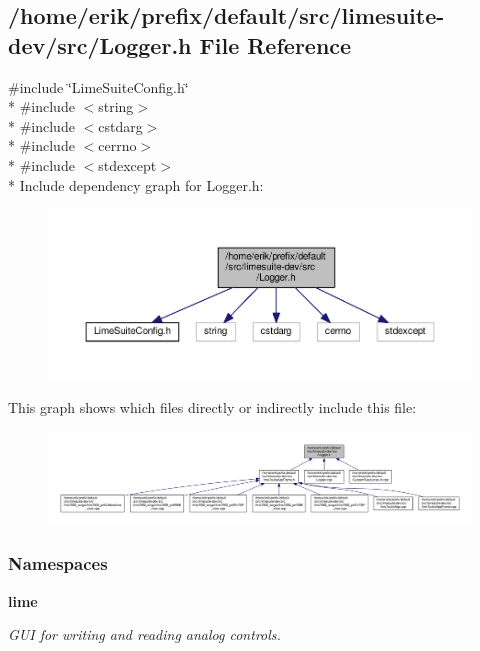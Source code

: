 \subsection{/home/erik/prefix/default/src/limesuite-\/dev/src/\+Logger.h File Reference}
\label{limesuite-dev_2src_2Logger_8h}
{\ttfamily \#include \char`\"{}Lime\+Suite\+Config.\+h\char`\"{}}\\*
{\ttfamily \#include $<$string$>$}\\*
{\ttfamily \#include $<$cstdarg$>$}\\*
{\ttfamily \#include $<$cerrno$>$}\\*
{\ttfamily \#include $<$stdexcept$>$}\\*
Include dependency graph for Logger.\+h\+:
\nopagebreak
\begin{figure}[H]
\begin{center}
\leavevmode
\includegraphics[width=350pt]{d6/d24/limesuite-dev_2src_2Logger_8h__incl}
\end{center}
\end{figure}
This graph shows which files directly or indirectly include this file\+:
\nopagebreak
\begin{figure}[H]
\begin{center}
\leavevmode
\includegraphics[width=350pt]{da/d29/limesuite-dev_2src_2Logger_8h__dep__incl}
\end{center}
\end{figure}
\subsubsection*{Namespaces}
\begin{DoxyCompactItemize}
\item 
 {\bf lime}
\begin{DoxyCompactList}\small\item\em G\+UI for writing and reading analog controls. \end{DoxyCompactList}\end{DoxyCompactItemize}
